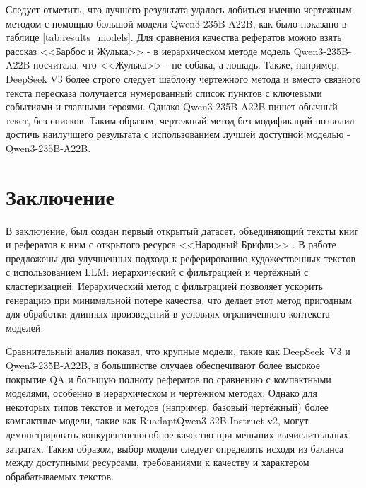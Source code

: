 \documentclass{article}
\begin{document}
Следует отметить, что лучшего результата удалось добиться именно чертежным методом с помощью большой модели Qwen3-\allowbreak 235B-\allowbreak A22B, 
как было показано в таблице \ref{tab:results_models}. Для сравнения качества рефератов можно взять рассказ <<Барбос и Жулька>> - в иерархическом методе
модель Qwen3-\allowbreak 235B-\allowbreak A22B посчитала, что <<Жулька>> - не собака, а лошадь. Также, например, DeepSeek V3 более строго следует шаблону чертежного метода и вместо связного текста пересказа получается нумерованный список
пунктов с ключевыми событиями и главными героями. Однако Qwen3-\allowbreak 235B-\allowbreak A22B пишет обычный текст, без списков. Таким образом, чертежный метод без модификаций позволил достичь наилучшего результата с использованием лучшей доступной моделью - 
Qwen3-\allowbreak 235B-\allowbreak A22B.


\section*{Заключение}
В заключение, был создан первый открытый датасет, объединяющий тексты книг и рефератов к ним с открытого ресурса <<Народный Брифли>> \cite{Briefly}. 
В работе предложены два улучшенных подхода к реферированию художественных текстов с использованием LLM: иерархический с фильтрацией и чертёжный с кластеризацией. 
Иерархический метод с фильтрацией позволяет ускорить генерацию при минимальной потере качества, 
что делает этот метод пригодным для обработки длинных произведений в условиях ограниченного контекста моделей.  

Сравнительный анализ показал, что крупные модели, такие как DeepSeek~V3 и Qwen3-\allowbreak 235B-\allowbreak A22B, в большинстве случаев обеспечивают более высокое покрытие QA и 
большую полноту рефератов по сравнению с компактными моделями, особенно в иерархическом и чертёжном методах. 
Однако для некоторых типов текстов и методов (например, базовый чертёжный) более компактные модели, такие как RuadaptQwen3-\allowbreak 32B-\allowbreak Instruct-\allowbreak v2, 
могут демонстрировать конкурентоспособное качество при меньших вычислительных затратах. 
Таким образом, выбор модели следует определять исходя из баланса между доступными ресурсами, требованиями к качеству и характером обрабатываемых текстов.



\end{document}
